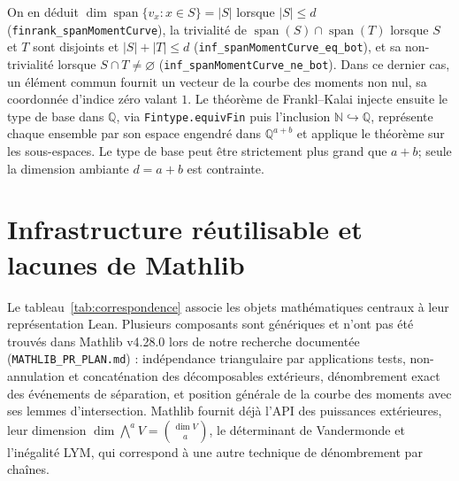 \documentclass[11pt]{article}
\newcommand{\NN}{\mathbb{N}}
\newcommand{\QQ}{\mathbb{Q}}
\newcommand{\bind}[2]{\binom{#1}{#2}}
\newcommand{\wedgep}[1]{\textstyle\bigwedge^{#1}}
\begin{document}
On en déduit
$\dim\operatorname{span}\{v_x:x\in S\}=|S|$ lorsque $|S|\le d$
(\lstinline{finrank_spanMomentCurve}), la trivialité de
$\operatorname{span}(S)\cap\operatorname{span}(T)$ lorsque $S$ et $T$ sont disjoints et
$|S|+|T|\le d$ (\lstinline{inf_spanMomentCurve_eq_bot}), et sa non-trivialité lorsque
$S\cap T\neq\varnothing$ (\lstinline{inf_spanMomentCurve_ne_bot}). Dans ce dernier cas,
un élément commun fournit un vecteur de la courbe des moments non nul, sa coordonnée
d'indice zéro valant $1$. Le théorème de Frankl--Kalai injecte ensuite le type de base
dans $\QQ$, via \lstinline{Fintype.equivFin} puis l'inclusion
$\NN\hookrightarrow\QQ$, représente chaque ensemble par son espace engendré dans
$\QQ^{a+b}$ et applique le théorème sur les sous-espaces. Le type de base peut être
strictement plus grand que $a+b$; seule la dimension ambiante $d=a+b$ est contrainte.

\section{Infrastructure réutilisable et lacunes de Mathlib}\label{sec:reuse}

Le tableau~\ref{tab:correspondence} associe les objets mathématiques centraux à leur
représentation Lean. Plusieurs composants sont génériques et n'ont pas été trouvés dans
Mathlib v4.28.0 lors de notre recherche documentée
(\texttt{MATHLIB\_PR\_PLAN.md}) : indépendance triangulaire par applications tests,
non-annulation et concaténation des décomposables extérieurs, dénombrement exact des
événements de séparation, et position générale de la courbe des moments avec ses lemmes
d'intersection. Mathlib fournit déjà l'API des puissances extérieures, leur dimension
$\dim\wedgep{a}V=\bind{\dim V}{a}$, le déterminant de Vandermonde et l'inégalité LYM,
qui correspond à une autre technique de dénombrement par chaînes.
\end{document}
